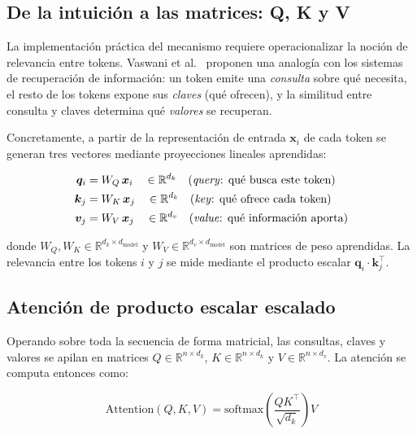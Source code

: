 \subsection{De la intuición a las matrices: Q, K y V}
\label{subsec:qkv}

La implementación práctica del mecanismo requiere operacionalizar la noción
de relevancia entre tokens. Vaswani et al.~\cite{vaswani2017attention}
proponen una analogía con los sistemas de recuperación de información: un
token emite una \textit{consulta} sobre qué necesita, el resto de los tokens
expone sus \textit{claves} (qué ofrecen), y la similitud entre consulta y
claves determina qué \textit{valores} se recuperan.

Concretamente, a partir de la representación de entrada $\bm{x}_i$ de cada
token se generan tres vectores mediante proyecciones lineales aprendidas:

\begin{align}
    \bm{q}_i &= W_Q\, \bm{x}_i \quad \in \mathbb{R}^{d_k}
    \quad \text{(\textit{query}: qué busca este token)} \\
    \bm{k}_j &= W_K\, \bm{x}_j \quad \in \mathbb{R}^{d_k}
    \quad \text{(\textit{key}: qué ofrece cada token)}   \\
    \bm{v}_j &= W_V\, \bm{x}_j \quad \in \mathbb{R}^{d_v}
    \quad \text{(\textit{value}: qué información aporta)}
\end{align}

\noindent donde $W_Q, W_K \in \mathbb{R}^{d_k \times d_{\text{model}}}$ y
$W_V \in \mathbb{R}^{d_v \times d_{\text{model}}}$ son matrices de peso
aprendidas. La relevancia entre los tokens $i$ y $j$ se mide mediante el
producto escalar $\bm{q}_i \cdot \bm{k}_j^\top$.



\subsection{Atención de producto escalar escalado}
\label{subsec:scaled_dot_product}

Operando sobre toda la secuencia de forma matricial, las consultas, claves
y valores se apilan en matrices $Q \in \mathbb{R}^{n \times d_k}$,
$K \in \mathbb{R}^{n \times d_k}$ y $V \in \mathbb{R}^{n \times d_v}$.
La atención se computa entonces como:

\begin{equation}
    \text{Attention}(Q, K, V) =
    \text{softmax}\!\left(\frac{QK^{\top}}{\sqrt{d_k}}\right) V
    \label{eq:attention}
\end{equation}

